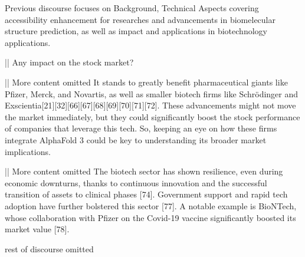 \begin{showcase}[title=Topic: AlphaFold 3]

{Previous discourse focuses on Background, Technical Aspects covering accessibility enhancement for researches and advancements in biomelecular structure prediction, as well as impact and applications in biotechnology applications.}

||
Any impact on the stock market?

||
{More content omitted} It stands to greatly benefit pharmaceutical giants like Pfizer, Merck, and Novartis, as well as smaller biotech firms like Schrödinger and Exscientia[21][32][66][67][68][69][70][71][72]. These advancements might not move the market immediately, but they could significantly boost the stock performance of companies that leverage this tech. So, keeping an eye on how these firms integrate AlphaFold 3 could be key to understanding its broader market implications.

||
{More content omitted} The biotech sector has shown resilience, even during economic downturns, thanks to continuous innovation and the successful transition of assets to clinical phases [74]. Government support and rapid tech adoption have further bolstered this sector [77]. A notable example is BioNTech, whose collaboration with Pfizer on the Covid-19 vaccine significantly boosted its market value [78].

{rest of discourse omitted}

\end{showcase}
